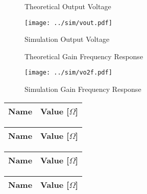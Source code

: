 \begin{figure}[H]
      \caption{Theoretical Output Voltage}
    \endminipage\hfill
      \texttt{[image: ../sim/vout.pdf]}
      \caption{Simulation Output Voltage}
    \endminipage\hfill
\end{figure}

\begin{figure}[H]
      \caption{Theoretical Gain Frequency Response}
    \endminipage\hfill
      \texttt{[image: ../sim/vo2f.pdf]}
      \caption{Simulation Gain Frequency Response}
    \endminipage\hfill
\end{figure}

\begin{center}
  \begin{tabular}{ | c | c | }
    \hline    
    {\bf Name} & {\bf Value [$\Omega$]} \\ \hline
  \end{tabular}
\end{center}

\begin{center}
  \begin{tabular}{ | c | c | }
    \hline    
    {\bf Name} & {\bf Value [$\Omega$]} \\ \hline
    
  \end{tabular}
\end{center}

\begin{center}
  \begin{tabular}{ | c | c | }
    \hline    
    {\bf Name} & {\bf Value [$\Omega$]} \\ \hline
  \end{tabular}
\end{center}

\begin{center}
  \begin{tabular}{ | c | c | }
    \hline    
    {\bf Name} & {\bf Value [$\Omega$]} \\ \hline
    
  \end{tabular}
\end{center}





